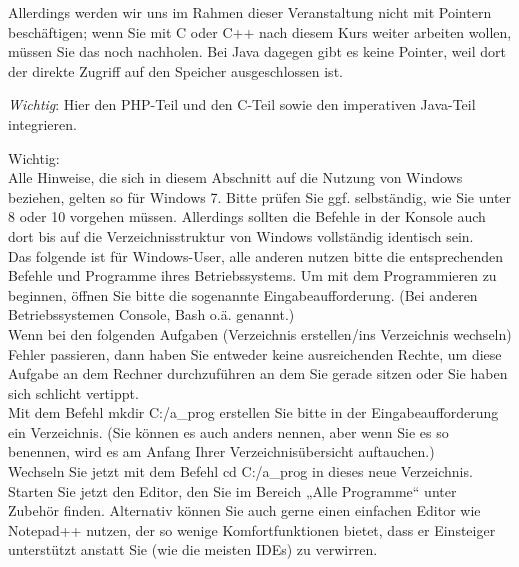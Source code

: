 Allerdings werden wir uns im Rahmen dieser Veranstaltung nicht mit Pointern beschäftigen; wenn Sie mit C oder C++ nach diesem Kurs weiter arbeiten wollen, müssen Sie das noch nachholen. Bei Java dagegen gibt es keine Pointer, weil dort der direkte Zugriff auf den Speicher ausgeschlossen ist.












\emph{Wichtig}: Hier den PHP-Teil und den C-Teil sowie den imperativen Java-Teil integrieren.






Wichtig:\\


Alle Hinweise, die sich in diesem Abschnitt auf die Nutzung von Windows beziehen, gelten so für Windows 7. Bitte prüfen Sie ggf. selbständig, wie Sie unter 8 oder 10 vorgehen müssen. Allerdings sollten die Befehle in der Konsole auch dort bis auf die Verzeichnisstruktur von Windows vollständig identisch sein.\\


Das folgende ist für Windows-User, alle anderen nutzen bitte die entsprechenden Befehle und Programme ihres Betriebssystems. Um mit dem Programmieren zu beginnen, öffnen Sie bitte die sogenannte Eingabeaufforderung. (Bei anderen Betriebssystemen Console, Bash o.ä. genannt.)\\


Wenn bei den folgenden Aufgaben (Verzeichnis erstellen/ins Verzeichnis wechseln) Fehler passieren, dann haben Sie entweder keine ausreichenden Rechte, um diese Aufgabe an dem Rechner durchzuführen an dem Sie gerade sitzen oder Sie haben sich schlicht vertippt.\\


Mit dem Befehl mkdir C:/a\_prog erstellen Sie bitte in der Eingabeaufforderung ein Verzeichnis. (Sie können es auch anders nennen, aber wenn Sie es so benennen, wird es am Anfang Ihrer Verzeichnisübersicht auftauchen.)\\

Wechseln Sie jetzt mit dem Befehl cd C:/a\_prog in dieses neue Verzeichnis. \\


Starten Sie jetzt den Editor, den Sie im Bereich „Alle Programme“ unter Zubehör finden. Alternativ können Sie auch gerne einen einfachen Editor wie Notepad++ nutzen, der so wenige Komfortfunktionen bietet, dass er Einsteiger unterstützt anstatt Sie (wie die meisten IDEs) zu verwirren.\\



